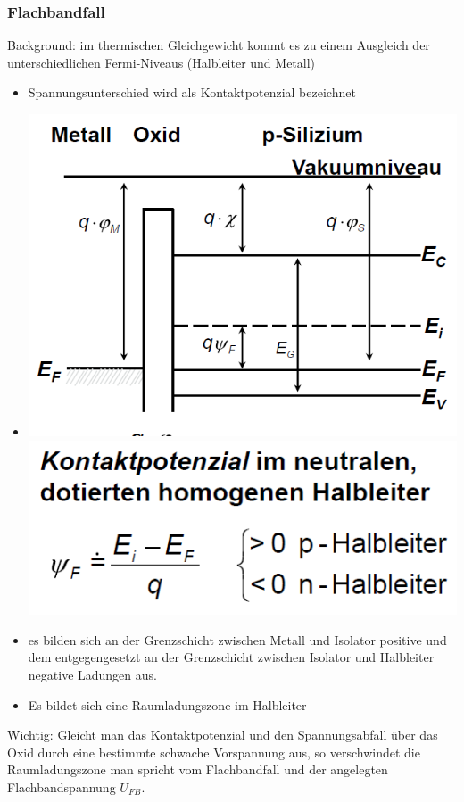 	\subsubsection{Flachbandfall}
		Background: im thermischen Gleichgewicht kommt es zu einem Ausgleich der unterschiedlichen Fermi-Niveaus (Halbleiter und Metall)
		\begin{itemize}
			\item Spannungsunterschied wird als Kontaktpotenzial bezeichnet
			\item \includegraphics[width=0.4\linewidth]{Kapitel/Kap06/Kontaktpotential} 			\includegraphics[width=0.4\linewidth]{Kapitel/Kap06/Kontaktpotential2}
			
			\item es bilden sich an der Grenzschicht zwischen Metall und Isolator positive und dem entgegengesetzt an der Grenzschicht zwischen Isolator und Halbleiter negative Ladungen aus.
			\item Es bildet sich eine Raumladungszone im Halbleiter			 		
		\end{itemize}
		Wichtig: Gleicht man das Kontaktpotenzial und den Spannungsabfall über das Oxid durch eine bestimmte schwache 	Vorspannung aus, so verschwindet die Raumladungszone man spricht vom Flachbandfall und der angelegten Flachbandspannung $U_{FB}$.
		
	\newpage
		
